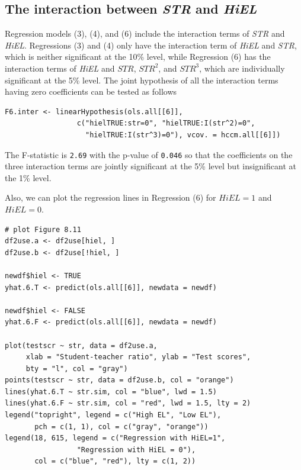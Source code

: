 \documentclass[11pt]{article}
\begin{document}
\subsection*{The interaction between \emph{STR} and \emph{HiEL}}
\label{sec:orgfbce228}
Regression models (3), (4), and (6) include the interaction terms of
\emph{STR} and \emph{HiEL}. Regressions (3) and (4) only have the interaction
term of \emph{HiEL} and \emph{STR}, which is neither significant at the 10\%
level, while Regression (6) has the interaction terms of \emph{HiEL} and
\(STR\), \(STR^2\), and \(STR^3\), which are individually significant at the
5\% level. The joint hypothesis of all the interaction terms having
zero coefficients can be tested as follows
\begin{verbatim}
F6.inter <- linearHypothesis(ols.all[[6]],
			     c("hielTRUE:str=0", "hielTRUE:I(str^2)=0",
			       "hielTRUE:I(str^3)=0"), vcov. = hccm.all[[6]])
\end{verbatim}

The F-statistic is \texttt{2.69} with the p-value of
\texttt{0.046} so that the coefficients on the three
interaction terms are jointly significant at the 5\% level but
insignificant at the 1\% level.

Also, we can plot the regression lines in Regression (6) for \(HiEL=1\)
and \(HiEL=0\).

\begin{verbatim}
# plot Figure 8.11
df2use.a <- df2use[hiel, ]
df2use.b <- df2use[!hiel, ]

newdf$hiel <- TRUE
yhat.6.T <- predict(ols.all[[6]], newdata = newdf)

newdf$hiel <- FALSE
yhat.6.F <- predict(ols.all[[6]], newdata = newdf)

plot(testscr ~ str, data = df2use.a,
     xlab = "Student-teacher ratio", ylab = "Test scores",
     bty = "l", col = "gray")
points(testscr ~ str, data = df2use.b, col = "orange")
lines(yhat.6.T ~ str.sim, col = "blue", lwd = 1.5)
lines(yhat.6.F ~ str.sim, col = "red", lwd = 1.5, lty = 2)
legend("topright", legend = c("High EL", "Low EL"),
       pch = c(1, 1), col = c("gray", "orange"))
legend(18, 615, legend = c("Regression with HiEL=1",
				 "Regression with HiEL = 0"),
       col = c("blue", "red"), lty = c(1, 2))
\end{verbatim}
\end{document}
